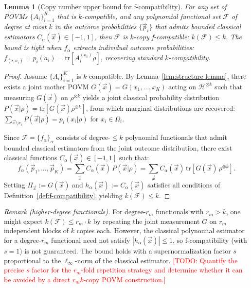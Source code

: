 \documentclass[aps,%
twocolumn,%
floatfix,%
pra,%
amsfonts,%
groupedaddress,%
superscriptaddress]{revtex4-2}%
\newtheorem{lemma}{Lemma}
\newcommand{\1}{\mathbbm{1}}
\begin{document}
\color{red}
\begin{lemma}[Copy number upper bound for f-compatibility]\label{lem:f-upperbound}
For any set of POVMs $\{A_i\}_{i=1}^K$ that is $k$-compatible, and any polynomial functional set $\mathcal{F}$ of degree at most $k$ in the outcome probabilities $\{\vec{p}_i\}$ that admits bounded classical estimators $C_\alpha(\vec{x}) \in [-1,1]$, then $\mathcal{F}$ is $k$-copy f-compatible: $k(\mathcal{F}) \leq k$. The bound is tight when $f_\alpha$ extracts individual outcome probabilities: $f_{(i,a_i)} = p_i(a_i) = \mathrm{tr}[A_i^{(a_i)} \rho]$, recovering standard $k$-compatibility.
\end{lemma}
\begin{proof}
    Assume $\{A_i\}_{i=1}^K$ is $k$-compatible. By Lemma~\ref{lem:structure-lemma}, there exists a joint mother POVM $G(\vec{x}) = G(x_1, \ldots, x_K)$ acting on $\mathcal{H}^{\otimes k}$ such that measuring $G(\vec{x})$ on $\rho^{\otimes k}$ yields a joint classical probability distribution $P(\vec{x}|\rho) = \mathrm{tr}[G(\vec{x})\rho^{\otimes k}]$, from which marginal distributions are recovered: $\sum_{\vec{x} \setminus x_i} P(\vec{x}|\rho) = p_i(x_i|\rho)$ for $x_i \in \Omega_i$.

    Since $\mathcal{F} = \{f_\alpha\}_{\alpha}$ consists of degree-$\leq k$ polynomial functionals that admit bounded classical estimators from the joint outcome distribution, there exist classical functions $C_\alpha(\vec{x}) \in [-1, 1]$ such that:
    $$
    f_\alpha(\vec{p}_1, \dots, \vec{p}_K) = \sum_{\vec{x}} C_\alpha(\vec{x})\, P(\vec{x}|\rho) = \sum_{\vec{x}} C_\alpha(\vec{x})\, \mathrm{tr}[G(\vec{x})\,\rho^{\otimes k}].
    $$
    Setting $\Pi_{\vec{x}} := G(\vec{x})$ and $h_\alpha(\vec{x}) := C_\alpha(\vec{x})$ satisfies all conditions of Definition~\ref{def:f-compatibility}, yielding $k(\mathcal{F}) \leq k$.
\end{proof}

\emph{Remark (higher-degree functionals).}
For degree-$r_m$ functionals with $r_m > k$, one might expect $k(\mathcal{F}) \leq r_m \cdot k$ by repeating the joint measurement $G$ on $r_m$ independent blocks of $k$ copies each. However, the classical polynomial estimator for a degree-$r_m$ functional need not satisfy $|h_\alpha(\vec{x})| \leq 1$, so f-compatibility (with $s = 1$) is not guaranteed. The bound holds with a supernormalization factor $s$ proportional to the $\ell_\infty$-norm of the classical estimator. \textcolor{red}{[TODO: Quantify the precise $s$ factor for the $r_m$-fold repetition strategy and determine whether it can be avoided by a direct $r_m k$-copy POVM construction.]}
\color{black}
\end{document}
